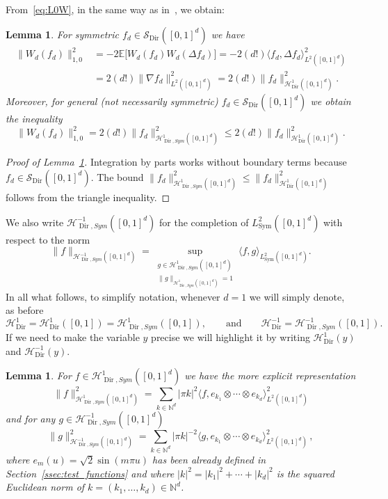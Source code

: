 \documentclass[10pt]{amsart}
\newtheorem{lemm}[theo]{Lemma}\newtheorem{prop}[theo]{Proposition}\newtheorem{coro}[theo]{Corollary}\newtheorem{conj}[theo]{Conjecture}
\theoremstyle{definition}\newtheorem{defi}[theo]{Definition}\newtheorem{rema}[theo]{Remark}\newtheorem{exam}[theo]{Example}\newtheorem{exem}[theo]{Example}\newtheorem{nota}[theo]{Notation}
\DeclareMathOperator{\Dir}{Dir}
\DeclareMathOperator{\Sym}{Sym}
\newcommand{\bb}[1]{{\mathbb #1}}
\newcommand{\mc}[1]{{\mathcal #1}}
\renewcommand{\mc}[1]{{\mathcal #1}}
\newcommand{\SD}{\ensuremath{\mc S_{\Dir}}}
\renewcommand{\leq}{\leqslant}
\begin{document}
From~\eqref{eq:L0W}, in the same way as in~\cite[Lemma~3.13]{Gubinelli2015Energy}, we obtain:

\begin{lemm}\label{lem:1-norm chaos}
For symmetric $f_d \in \SD ([0, 1]^d)$ we have
\begin{align*}
\big\| W_d (f_d) \big\|_{1,0}^2 & = - 2\mathbb{E} \big[W_d (f_d) W_d (\Delta f_d)\big] = - 2 (d!) \big\langle f_d, \Delta f_d \big\rangle_{L^2([0,1]^d)}^2\\
& = 2 (d!) \big\| \nabla f_d \big\|_{L^2([0,1]^d)}^2 = 2 (d!) \big\| f_d \big\|_{\mc H_{\Dir}^1 ([0, 1]^d)}^2.
\end{align*}
Moreover, for general (not necessarily symmetric) $f_d \in \SD ([0, 1]^d)$ we obtain the inequality
\[
\big\| W_d (f_d)\big\|_{1,0}^2 = 2(d!) \big\| f_d \big\|_{\mc H_{\Dir, Sym}^1 ([0, 1]^d)}^2 \leq 2 (d!) \big\| f_d \big\|_{\mc H_{\Dir}^1 ([0, 1]^d)}^2.
\]
\end{lemm}

\begin{proof}[Proof of Lemma~\ref{lem:1-norm chaos}]
Integration by parts works without boundary terms because $f_d \in \SD ([0, 1]^d)$. The bound $\| f_d \|_{\mc H_{\Dir, Sym}^1 ([0, 1]^d)}^2 \leq \| f_d \|_{\mc H_{\Dir}^1 ([0, 1]^d)}^2$ follows from the triangle inequality.
\end{proof}%

We also write $\mc H_{\Dir, Sym}^{-1} ([0, 1]^d)$ for the completion of $L^2_{\Sym} ([0, 1]^d)$ with respect to the norm
\begin{equation}\label{eq:H0s-var-def}
\| f \|_{\mc H_{\Dir, Sym}^{-1} ([0, 1]^d)} = \sup_{\substack{ g \in \mc H_{\Dir, Sym}^{1} ([0, 1]^d)\\
\| g \|_{\mc H_{\Dir, Sym}^{1} ([0, 1]^d)} = 1}} \big\langle f, g \big\rangle_{L^2_{\Sym} ([0, 1]^d)}.
\end{equation}
In all what follows, to simplify notation, whenever $d=1$ we will simply denote, as before
\[
\mc H_{\Dir}^{1}=\mc H_{\Dir}^{1} ([0, 1])=\mc H_{\Dir, Sym}^{1} ([0, 1]), \qquad \text{and}\qquad \mc H_{\Dir}^{-1}=\mc H_{\Dir, Sym}^{-1} ([0, 1]).
\]
If we need to make the variable $y$ precise we will highlight it by writing $\mc H_{\Dir}^{1}(y)$ and $\mc H_{\Dir}^{-1}(y)$.


\begin{lemm}\label{lem:explicit-norms}
For $f \in \mc H_{\Dir, Sym}^1 ([0, 1]^d)$ we have the more explicit representation
\[
\| f \|_{\mc H_{\Dir, Sym}^1 ([0, 1]^d)}^2 = \sum_{k \in \mathbb{N}^d} | \pi k |^2 \big\langle f, e_{k_1} \otimes \cdots \otimes e_{k_d} \big\rangle_{L^2([0,1]^d)}^2
\]
and for any $g \in \mc H_{\Dir, Sym}^{-1} ([0, 1]^d)$
\[
\| g \|_{\mc H_{\Dir, Sym}^{-1} ([0, 1]^d)}^2 = \sum_{k \in \mathbb{N}^d}|
\pi k |^{- 2} \big\langle g,e_{k_1} \otimes \cdots \otimes e_{k_d} \big\rangle_{L^2([0,1]^d)}^2\,,
\]
where $e_m(u)=\sqrt 2\sin(m\pi u)$ has been already defined in Section~\ref{ssec:test_functions} and where $|k|^2 = |k_1|^2 + \cdots + |k_d|^2$ is the squared Euclidean norm of $k=(k_1,\dots,k_d) \in \bb N^d$.
\end{lemm}
\end{document}
